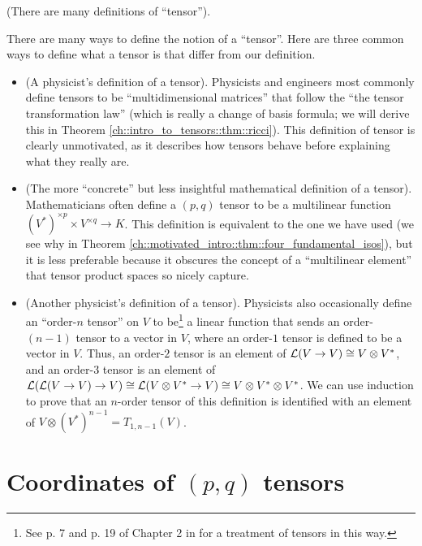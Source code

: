 \begin{remark}
\label{ch::motivated_intro::rmk::many_defs_tensor}
    (There are many definitions of ``tensor'').
    
    There are many ways to define the notion of a ``tensor''. Here are three common ways to define what a tensor is that differ from our definition.
    
    \begin{itemize}
        \item (A physicist's definition of a tensor). Physicists and engineers most commonly define tensors to be ``multidimensional matrices'' that follow the ``the tensor transformation law'' (which is really a change of basis formula; we will derive this in Theorem \ref{ch::intro_to_tensors::thm::ricci}). This definition of tensor is clearly unmotivated, as it describes how tensors behave before explaining what they really are.
        \item (The more ``concrete'' but less insightful mathematical definition of a tensor). Mathematicians often define a $(p, q)$ tensor to be a multilinear function $(V^*)^{\times p} \times V^{\times q} \rightarrow K$. This definition is equivalent to the one we have used (we see why in Theorem \ref{ch::motivated_intro::thm::four_fundamental_isos}), but it is less preferable because it obscures the concept of a ``multilinear element'' that tensor product spaces so nicely capture.
        \item (Another physicist's definition of a tensor). Physicists also occasionally define an ``order-$n$ tensor'' on $V$ to be\footnote{See p. 7 and p. 19 of Chapter 2 in \cite{BonetWood} for a treatment of tensors in this way.} a linear function that sends an order-$(n - 1)$ tensor to a vector in $V$, where an order-$1$ tensor is defined to be a vector in $V$. Thus, an order-$2$ tensor is an element of $\mathcal{L}(V \rightarrow V) \cong V \otimes V^*$, and an order-$3$ tensor is an element of $\mathcal{L}(\mathcal{L}(V \rightarrow V) \rightarrow V) \cong \mathcal{L}(V \otimes V^* \rightarrow V) \cong V \otimes V^* \otimes V^*$. We can use induction to prove that an $n$-order tensor of this definition is identified with an element of $V \otimes (V^{*})^{n - 1} = T_{1, n - 1}(V)$.
    \end{itemize}
\end{remark}

\newpage

\section{Coordinates of $(p, q)$ tensors}

